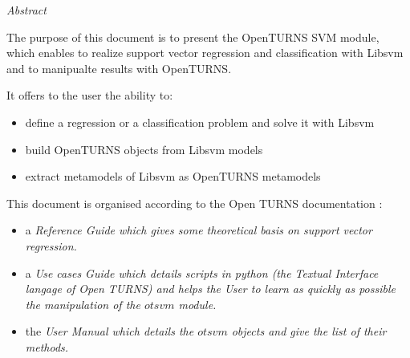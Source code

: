 %  
\vspace{0.5in}
\begin{center}
\vspace{0.3in}
\emph{ Abstract}
\vspace{0.5in}
\end{center}

The purpose of this document is to present the OpenTURNS SVM module, which enables to realize support vector regression and classification with Libsvm and to manipualte results with OpenTURNS.

It offers to the user the ability to:
\begin{itemize}
 \item define a regression or a classification problem and solve it with Libsvm
 \item build OpenTURNS objects from Libsvm models
 \item extract metamodels of Libsvm as OpenTURNS metamodels
\end{itemize}


This document is organised according to the Open TURNS documentation :
\begin{itemize}
\item a \itshape{Reference Guide} which gives some theoretical basis on support vector regression.
\item a \itshape{Use cases Guide} which details scripts in python (the Textual Interface langage of Open TURNS) and helps the User to learn as quickly as possible the manipulation of the $otsvm$ module.
\item the \itshape{User Manual} which details the $otsvm$ objects and give the list of their methods.
\end{itemize}

